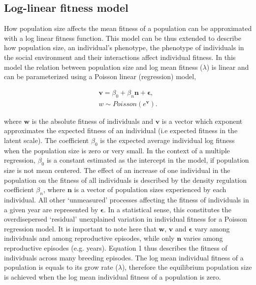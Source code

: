 \documentclass{article}
\begin{document}
\subsection{Log-linear fitness model}
How population size affects the mean fitness of a population can be approximated with a log linear fitness function. This model can be thus extended to describe how population size, an individual's phenotype, the phenotype of individuals in the social environment and their interactions affect individual fitness. In this model the relation between population size and log mean fitness ($\lambda$) is linear and can be parameterized using a Poisson linear (regression) model, 

\begin{subequations}
	\begin{gather}
	\bm{v}=\beta_{0} +\beta_{n} \bm{n} +  \bm{\epsilon}, \tag{1.1a}\label{eq:fitness1} \\
	w \sim Poisson(e^{\bm{v}}). \tag{1.1b}
	\end{gather}
\end{subequations}

\noindent where $\bm{w}$ is the absolute fitness of individuals and $\bm{v}$ is a vector which exponent approximates the expected fitness of an individual (i.e expected fitness in the latent scale). The coefficient $\beta_{0}$ is the expected average individual log fitness when the population size is zero or very small. In the context of a multiple regression, $\beta_{0}$ is a constant estimated as the intercept in the model, if population size is not mean centered. The effect of an increase of one individual in the population on the fitness of all individuals is described by the density regulation coefficient $\beta_{n}$, where $\bm{n}$ is a vector of population sizes experienced by each individual. All other `unmeasured' processes affecting the fitness of individuals in a given year are represented by $\bm{\epsilon}$. In a statistical sense, this constitutes the overdisepersed `residual' unexplained variation in individual fitness for a Poisson regression model. It is important to note here that $\bm{w}$, $\bm{v}$ and $\bm{\epsilon}$ vary among individuals and among reproductive episodes, while only $\bm{n}$ varies among reproductive episodes (e.g. years). Equation 1 thus describes the fitness of individuals across many breeding episodes. The log mean individual fitness of a population is equals to its grow rate ($\lambda$), therefore the equilibrium population size is achieved when the log mean individual fitness of a population is zero. 
\end{document}
